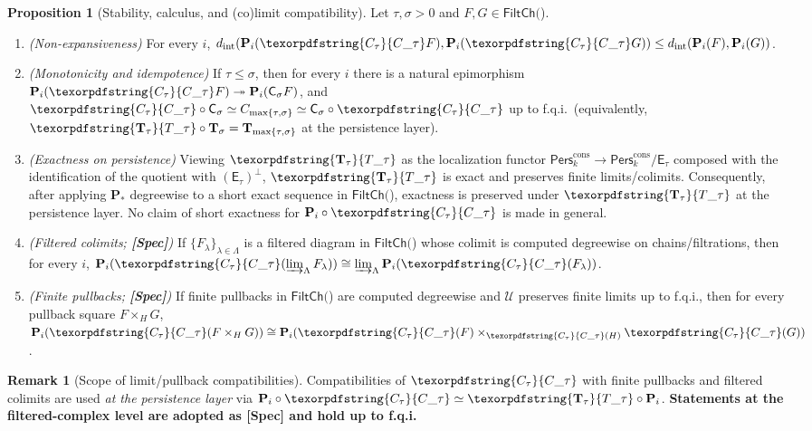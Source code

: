 \documentclass[11pt]{article}
\numberwithin{equation}{section}
\theoremstyle{plain}
\theoremstyle{definition}
\theoremstyle{remark}
\newcommand{\Pers}{\mathsf{Pers}}
\theoremstyle{plain}
\theoremstyle{definition}
\numberwithin{equation}{section}
\newtheorem{proposition}[theorem]{Proposition}
\theoremstyle{definition}
\newtheorem{remark}[theorem]{Remark}
\DeclareRobustCommand{\FiltCh}[1]{\mathsf{FiltCh}(#1)}
\DeclareRobustCommand{\Ttau}{\texorpdfstring{\ensuremath{\mathbf{T}_{\tau}}}{T\_\tau}}
\DeclareRobustCommand{\Ctau}{\texorpdfstring{\ensuremath{C_{\tau}}}{C\_\tau}}
\numberwithin{equation}{section}
\theoremstyle{plain}
\theoremstyle{definition}
\theoremstyle{remark}
\newcommand{\Perscons}{\Pers^{\mathrm{cons}}_k}
\newcommand{\intdist}{d_{\mathrm{int}}}
\newcommand{\Ecat}{\mathsf{E}_\tau}
\newcommand{\Orth}{(\mathsf{E}_\tau)^{\perp}}
\providecommand{\Cfun}[1]{\mathsf{C}_{#1}}
\providecommand{\Tfun}[1]{\mathbf{T}_{#1}}
\providecommand{\Ctau}{\Cfun{\tau}}
\providecommand{\Csigma}{\Cfun{\sigma}}
\providecommand{\Ttau}{\Tfun{\tau}}
\providecommand{\intdist}{d_{\mathrm{int}}}  %
\begin{document}
\begin{proposition}[Stability, calculus, and (co)limit compatibility]\label{prop:stability}
Let \(\tau,\sigma>0\) and \(F,G\in\FiltCh\).
\begin{enumerate}[leftmargin=1.5em]
  \item \emph{(Non-expansiveness)} For every \(i\),
  \(\intdist(\mathbf{P}_i(\Ctau F),\mathbf{P}_i(\Ctau G)) \le \intdist(\mathbf{P}_i(F),\mathbf{P}_i(G))\).
  \item \emph{(Monotonicity and idempotence)} If \(\tau\le\sigma\), then for every \(i\) there is a natural epimorphism \(\mathbf{P}_i(\Ctau F)\twoheadrightarrow \mathbf{P}_i(\Csigma F)\), and \(\Ctau\circ \Csigma\simeq C_{\max\{\tau,\sigma\}}\simeq \Csigma\circ \Ctau\) up to f.q.i.\ (equivalently, \(\Ttau\circ \mathbf{T}_\sigma=\mathbf{T}_{\max\{\tau,\sigma\}}\) at the persistence layer).
  \item \emph{(Exactness on persistence)} Viewing \(\Ttau\) as the localization functor \(\Perscons\to \Perscons/\Ecat\) composed with the identification of the quotient with \(\Orth\), \(\Ttau\) is exact and preserves finite limits/colimits. Consequently, after applying \(\mathbf{P}_\ast\) degreewise to a short exact sequence in \(\FiltCh\), exactness is preserved under \(\Ttau\) at the persistence layer. No claim of short exactness for \(\mathbf{P}_i\circ \Ctau\) is made in general.
  \item \emph{(Filtered colimits; \textbf{[Spec]})} If \(\{F_\lambda\}_{\lambda\in\Lambda}\) is a filtered diagram in \(\FiltCh\) whose colimit is computed degreewise on chains/filtrations, then for every \(i\),
  \(\mathbf{P}_i(\Ctau(\varinjlim_\Lambda F_\lambda)) \cong \varinjlim_\Lambda \mathbf{P}_i(\Ctau(F_\lambda))\).
  \item \emph{(Finite pullbacks; \textbf{[Spec]})} If finite pullbacks in \(\FiltCh\) are computed degreewise and \(\mathcal{U}\) preserves finite limits up to f.q.i., then for every pullback square \(F\times_H G\),
  \(\mathbf{P}_i(\Ctau(F\times_H G))\cong \mathbf{P}_i(\Ctau(F)\times_{\Ctau(H)}\Ctau(G))\).
\end{enumerate}
\end{proposition}

\begin{remark}[Scope of limit/pullback compatibilities]
Compatibilities of \(\Ctau\) with finite pullbacks and filtered colimits are used \emph{at the persistence layer} via \(\mathbf{P}_i\circ \Ctau\simeq \Ttau\circ \mathbf{P}_i\).
\textbf{Statements at the filtered-complex level are adopted as [Spec] and hold up to f.q.i.}
\end{remark}
\end{document}
